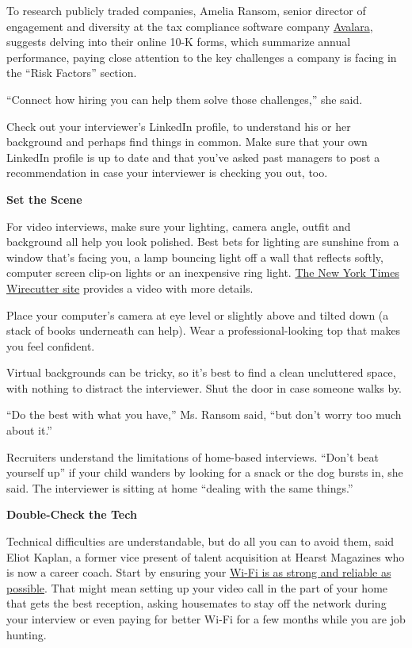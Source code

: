 To research publicly traded companies, Amelia Ransom, senior director of
engagement and diversity at the tax compliance software company
\href{https://www.avalara.com/us/en/index.html}{Avalara}, suggests
delving into their online 10-K forms, which summarize annual
performance, paying close attention to the key challenges a company is
facing in the ``Risk Factors'' section.

``Connect how hiring you can help them solve those challenges,'' she
said.

Check out your interviewer's LinkedIn profile, to understand his or her
background and perhaps find things in common. Make sure that your own
LinkedIn profile is up to date and that you've asked past managers to
post a recommendation in case your interviewer is checking you out, too.

\textbf{Set the Scene}

For video interviews, make sure your lighting, camera angle, outfit and
background all help you look polished. Best bets for lighting are
sunshine from a window that's facing you, a lamp bouncing light off a
wall that reflects softly, computer screen clip-on lights or an
inexpensive ring light.
\href{https://www.nytimes3xbfgragh.onion/wirecutter/blog/video-call-lighting-tips/}{The
New York Times Wirecutter site} provides a video with more details.

Place your computer's camera at eye level or slightly above and tilted
down (a stack of books underneath can help). Wear a professional-looking
top that makes you feel confident.

Virtual backgrounds can be tricky, so it's best to find a clean
uncluttered space, with nothing to distract the interviewer. Shut the
door in case someone walks by.

``Do the best with what you have,'' Ms. Ransom said, ``but don't worry
too much about it.''

Recruiters understand the limitations of home-based interviews. ``Don't
beat yourself up'' if your child wanders by looking for a snack or the
dog bursts in, she said. The interviewer is sitting at home ``dealing
with the same things.''

\textbf{Double-Check the Tech}

Technical difficulties are understandable, but do all you can to avoid
them, said Eliot Kaplan, a former vice present of talent acquisition at
Hearst Magazines who is now a career coach. Start by ensuring your
\href{https://www.nytimes3xbfgragh.onion/wirecutter/blog/make-wi-fi-suck-less-working-from-home/}{Wi-Fi
is as strong and reliable as possible}. That might mean setting up your
video call in the part of your home that gets the best reception, asking
housemates to stay off the network during your interview or even paying
for better Wi-Fi for a few months while you are job hunting.

